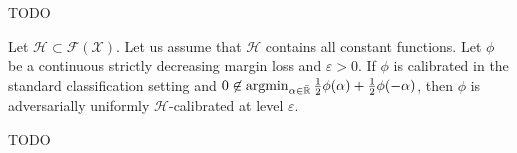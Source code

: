 TODO

\begin{prop*}
Let $\mathcal{H}\subset \mathcal{F}(\mathcal{X})$. Let us assume that $\mathcal{H}$ contains all constant functions.
Let $\phi$  be a continuous strictly decreasing margin loss and $\varepsilon>0$. If $\phi$ is calibrated in the standard classification setting and $0\not\in \operatorname*{argmin}_{\alpha\in\bar{\mathbb{R}}}
\frac12\phi(\alpha)+\frac12\phi(-\alpha)$, then $\phi$ is adversarially uniformly $\mathcal{H}$-calibrated at level $\varepsilon$.


\end{prop*}

TODO
